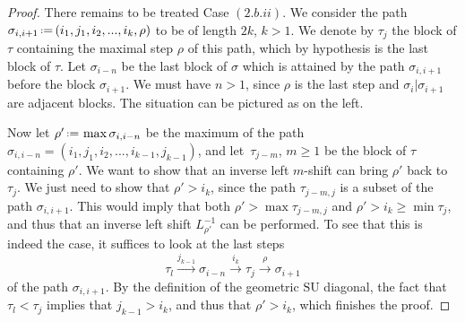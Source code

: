 \documentclass{amsart}
\theoremstyle{definition}
\newcommand{\ssm}{\smallsetminus} %
\newcommand{\eqdef}{\mbox{\,\raisebox{0.2ex}{\scriptsize\ensuremath{\mathrm:}}\ensuremath{=}\,}} %
\newcommand{\SU}{\mathrm{SU}}
\begin{document}
\begin{proof}
There remains to be treated Case $(2.b.ii)$.
We consider the path $\sigma_{i,i+1} \eqdef (i_1,j_1,i_2,...,i_{k},\rho)$ to be of length $2k$, $k>1$. 
We denote by $\tau_j$ the block of $\tau$ containing the maximal step $\rho$ of this path, which by hypothesis is the last block of $\tau$. 
Let $\sigma_{i-n}$ be the last block of $\sigma$ which is attained by the path $\sigma_{i,i+1}$ before the block $\sigma_{i+1}$. 
We must have $n>1$, since $\rho$ is the last step and $\sigma_i|\sigma_{i+1}$ are adjacent blocks.
The situation can be pictured as on the left.
\begin{center}
\end{center}
Now let $\rho' \eqdef \max\sigma_{i,i-n}$ be the maximum of the path $\sigma_{i,i-n}=(i_1,j_1,i_2,...,i_{k-1},j_{k-1})$, and let~$\tau_{j-m}$, $m\geq 1$ be the block of $\tau$ containing $\rho'$.
We want to show that an inverse left $m$-shift can bring $\rho'$ back to $\tau_j$.  
We just need to show that $\rho' > i_k$, since the path $\tau_{j-m,j}$ is a subset of the path $\sigma_{i,i+1}$. 
This would imply that both $\rho' > \max \tau_{j-m,j}$ and $\rho' > i_k \geq \min \tau_j$, and thus that an inverse left shift $L_{\rho'}^{-1}$ can be performed.
To see that this is indeed the case, it suffices to look at the last steps $$\tau_l \overset{j_{k-1}}{\longrightarrow} \sigma_{i-n} \overset{i_{k}}{\longrightarrow} \tau_j \overset{\rho}{\longrightarrow} \sigma_{i+1}$$ of the path $\sigma_{i,i+1}$. 
By the definition of the geometric $\SU$ diagonal, the fact that $\tau_l < \tau_j$ implies that $j_{k-1} > i_k$, and thus that $\rho' > i_k$, which finishes the proof. 
\end{proof}
\end{document}
